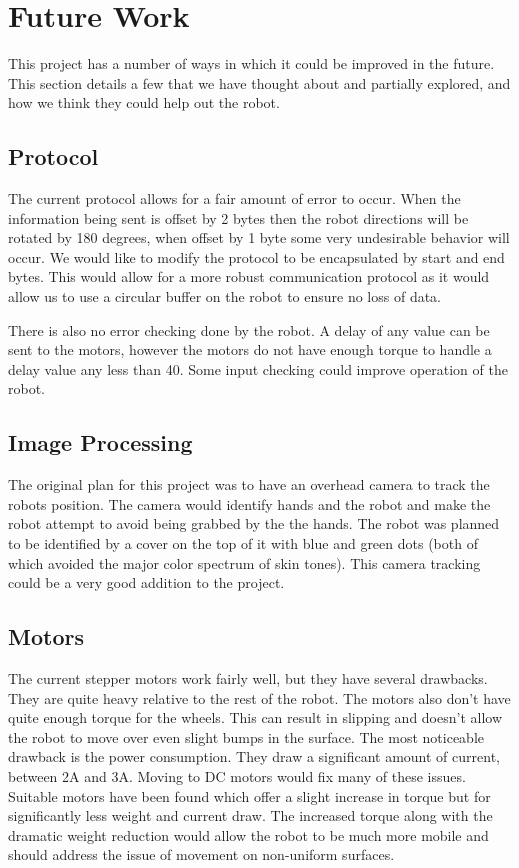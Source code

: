 \section{Future Work}

This project has a number of ways in which it could be improved in the future.  This section details a few that we have thought about and partially explored, and how we think they could help out the robot.

\subsection{Protocol}
The current protocol allows for a fair amount of error to occur.  When the information being sent is offset by 2 bytes then the robot directions will be rotated by 180 degrees, when offset by 1 byte some very undesirable behavior will occur.  We would like to modify the protocol to be encapsulated by start and end bytes.  This would allow for a more robust communication protocol as it would allow us to use a circular buffer on the robot to ensure no loss of data.

There is also no error checking done by the robot.  A delay of any value can be sent to the motors, however the motors do not have enough torque to handle a delay value any less than 40.  Some input checking could improve operation of the robot.

\subsection{Image Processing}
The original plan for this project was to have an overhead camera to track the robots position.  The camera would identify hands and the robot and make the robot attempt to avoid being grabbed by the the hands.  The robot was planned to be identified by a cover on the top of it with blue and green dots (both of which avoided the major color spectrum of skin tones).  This camera tracking could be a very good addition to the project.

\subsection{Motors}
The current stepper motors work fairly well, but they have several drawbacks.  They are quite heavy relative to the rest of the robot.  The motors also don’t have quite enough torque for the wheels.  This can result in slipping and doesn’t allow the robot to move over even slight bumps in the surface.  The most noticeable drawback is the power consumption.  They draw a significant amount of current, between 2A and 3A.  Moving to DC motors would fix many of these issues.  Suitable motors have been found which offer a slight increase in torque but for significantly less weight and current draw.  The increased torque along with the dramatic weight reduction would allow the robot to be much more mobile and should address the issue of movement on non-uniform surfaces.

